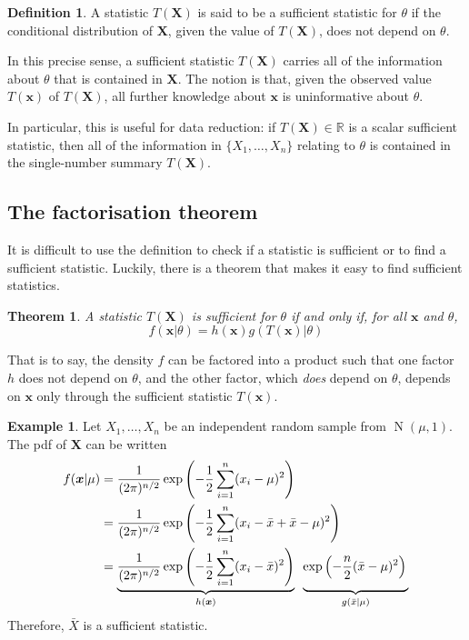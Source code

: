 \documentclass[
]{book}
\newcommand{\bx}{{\boldsymbol x}}
\newcommand{\bX}{{\boldsymbol X}}
\DeclareMathOperator{\N}{N}
\newcommand{\bbR}{\mathbb{R}}
\newcommand{\half}[1][1]{\frac{#1}{2}}  %
\newtheorem{theorem}{Theorem}[chapter]
\theoremstyle{definition}
\newtheorem{definition}{Definition}[chapter]
\theoremstyle{definition}
\newtheorem{example}{Example}[chapter]
\theoremstyle{definition}
\theoremstyle{definition}
\theoremstyle{remark}
\begin{document}
\begin{definition}
A statistic \(T(\bX)\) is said to be a sufficient statistic for \(\theta\) if the conditional distribution of \(\bX\), given the value of \(T(\bX)\), does not depend on \(\theta\).
\end{definition}

In this precise sense, a sufficient statistic \(T(\bX)\) carries all of the information about \(\theta\) that is contained in \(\bX\).
The notion is that, given the observed value \(T(\bx)\) of \(T(\bX)\), all further knowledge about \(\bx\) is uninformative about \(\theta\).

In particular, this is useful for data reduction: if \(T(\bX) \in \bbR\) is a scalar sufficient statistic, then all of the information in \(\{X_1,\dots,X_n\}\) relating to \(\theta\) is contained in the single-number summary \(T(\bX)\).

\hypertarget{the-factorisation-theorem}{%
\subsection{The factorisation theorem}\label{the-factorisation-theorem}}

It is difficult to use the definition to check if a statistic is sufficient or to find a sufficient statistic. Luckily, there is a theorem that makes it easy to find sufficient statistics.

\begin{theorem}
A statistic \(T(\bX)\) is sufficient for \(\theta\) if and only if, for all \(\bx\) and \(\theta\),
\[
f(\bx|\theta) = h(\bx)g(T(\bx)|\theta)
\]
\end{theorem}

That is to say, the density \(f\) can be factored into a product such that one factor \(h\) does not depend on \(\theta\), and the other factor, which \emph{does} depend on \(\theta\), depends on \(\bx\) only through the sufficient statistic \(T(\bx)\).

\begin{example}
Let \(X_1,\dots,X_n\) be an independent random sample from \(\N(\mu,1)\). The pdf of \(\bX\) can be written
\begin{align*}
f(\bx|\mu) 
&= \frac{1}{(2\pi)^{n/2}}\exp\left(-\half \sum_{i=1}^n(x_i-\mu)^2 \right) \\
&= \frac{1}{(2\pi)^{n/2}}\exp\left(-\half \sum_{i=1}^n(x_i-\bar x + \bar x -\mu)^2 \right) \\
&= 
\underbrace{\frac{1}{(2\pi)^{n/2}}\exp\left(-\half \sum_{i=1}^n(x_i-\bar x)^2 \right)}_{h(\bx)} \hspace{0.5em} 
\underbrace{\exp\left(-\frac{n}{2}(\bar x - \mu)^2 \right) 
\vphantom{  \frac{1}{(2\pi)^{n/2}}\exp\left(-\half \sum_{i=1}^n(x_i-\bar x)^2 \right)  }}_{g(\bar x|\mu)}
\end{align*}
Therefore, \(\bar X\) is a sufficient statistic.
\end{example}
\end{document}
